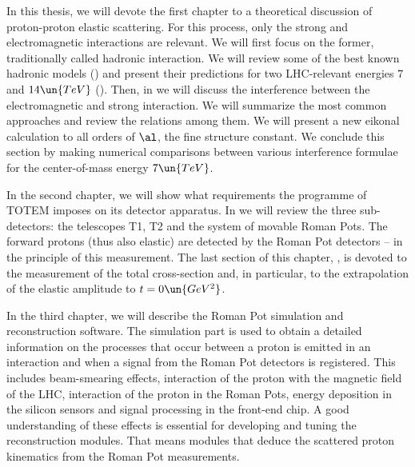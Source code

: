 In this thesis, we will devote the first chapter to a theoretical discussion of proton-proton elastic scattering. For this process, only the strong and electromagnetic interactions are relevant. We will first focus on the former, traditionally called hadronic interaction. We will review some of the best known hadronic models () and present their predictions for two LHC-relevant energies $7$ and $14\un{TeV}$ (). Then, in  we will discuss the interference between the electromagnetic and strong interaction. We will summarize the most common approaches and review the relations among them. We will present a new eikonal calculation to all orders of $\al$, the fine structure constant. We conclude this section by making numerical comparisons between various interference formulae for the center-of-mass energy $7\un{TeV}$.

In the second chapter, we will show what requirements the programme of TOTEM imposes on its detector apparatus. In  we will review the three sub-detectors: the telescopes T1, T2 and the system of movable Roman Pots. The forward protons (thus also elastic) are detected by the Roman Pot detectors -- in  the principle of this measurement. The last section of this chapter, , is devoted to the measurement of the total cross-section and, in particular, to the extrapolation of the elastic amplitude to $t=0\un{GeV^2}$.

In the third chapter, we will describe the Roman Pot simulation and reconstruction software. The simulation part is used to obtain a detailed information on the processes that occur between a proton is emitted in an interaction and when a signal from the Roman Pot detectors is registered. This includes beam-smearing effects, interaction of the proton with the magnetic field of the LHC, interaction of the proton in the Roman Pots, energy deposition in the silicon sensors and signal processing in the front-end chip. A good understanding of these effects is essential for developing and tuning the reconstruction modules. That means modules that deduce the scattered proton kinematics from the Roman Pot measurements.

